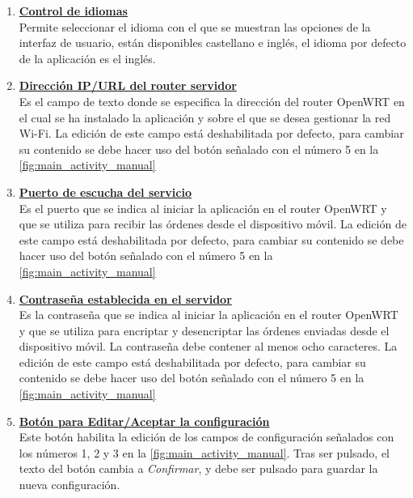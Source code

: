 \documentclass[12pt, twoside]{article}
\begin{document}
        \begin{enumerate}

            \item \textbf{\underline{Control de idiomas}} \\
            Permite seleccionar el idioma con el que se muestran las opciones de la interfaz de usuario, están disponibles castellano e inglés, el idioma por defecto de la aplicación es el inglés.

            \item \textbf{\underline{Dirección IP/URL del router servidor}} \\
            Es el campo de texto donde se especifica la dirección del router OpenWRT en el cual se ha instalado la aplicación y sobre el que se desea gestionar la red Wi-Fi. La edición de este campo está deshabilitada por defecto, para cambiar su contenido se debe hacer uso del botón señalado con el número 5 en la \ref{fig:main_activity_manual}

            \item \textbf{\underline{Puerto de escucha del servicio}} \\
            Es el puerto que se indica al iniciar la aplicación en el router OpenWRT y que se utiliza para recibir las órdenes desde el dispositivo móvil. La edición de este campo está deshabilitada por defecto, para cambiar su contenido se debe hacer uso del botón señalado con el número 5 en la \ref{fig:main_activity_manual}

            \item \textbf{\underline{Contraseña establecida en el servidor}} \\
            Es la contraseña que se indica al iniciar la aplicación en el router OpenWRT y que se utiliza para encriptar y desencriptar las órdenes enviadas desde el dispositivo móvil. La contraseña debe contener al menos ocho caracteres. La edición de este campo está deshabilitada por defecto, para cambiar su contenido se debe hacer uso del botón señalado con el número 5 en la \ref{fig:main_activity_manual}

            \item \textbf{\underline{Botón para Editar/Aceptar la configuración}} \\
            Este botón habilita la edición de los campos de configuración señalados con los números 1, 2 y 3 en la \ref{fig:main_activity_manual}. Tras ser pulsado, el texto del botón cambia a \textit{Confirmar}, y debe ser pulsado para guardar la nueva configuración.


\end{enumerate}
\end{document}
